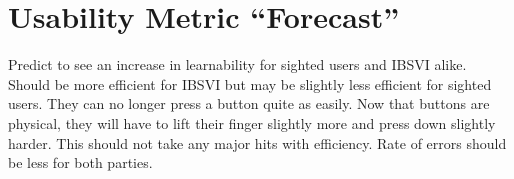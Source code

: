 \documentclass[11pt]{article}
\begin{document}
\section{Usability Metric ``Forecast''}
Predict to see an increase in learnability for sighted users and IBSVI alike. Should be more efficient for IBSVI but may be slightly less efficient for sighted users. They can no longer press a button quite as easily. Now that buttons are physical, they will have to lift their finger slightly more and press down slightly harder. This should not take any major hits with efficiency. Rate of errors should be less for both parties.
\clearpage


{}

\end{document}
